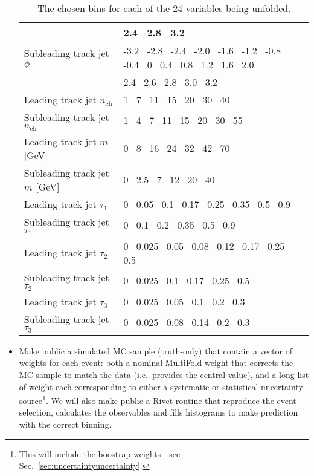 \begin{itemize}
\begin{table}[h!]
\begin{tabular}{l|l}
                                               & 2.4~ 2.8~ 3.2 \\ \hline
       Subleading track jet $\phi$             & -3.2~ -2.8~ -2.4~ -2.0~ -1.6~ -1.2~ -0.8~ -0.4~ 0~ 0.4~ 0.8~ 1.2~ 1.6~ 2.0~ \\
                                               & 2.4~ 2.6~ 2.8~ 3.0~ 3.2 \\ \hline
       Leading track jet $n_{\text{ch}}$       & 1~ 7~ 11~ 15~ 20~ 30~ 40 \\ \hline
       Subleading track jet $n_{\text{ch}}$    & 1~ 4~ 7~ 11~ 15~ 20~ 30~ 55 \\ \hline
       Leading track jet $m$ [GeV]             & 0~ 8~ 16~ 24~ 32~ 42~ 70 \\ \hline
       Subleading track jet $m$ [GeV]          & 0~ 2.5~ 7~ 12~ 20~ 40 \\ \hline
       Leading track jet $\tau_1$              & 0~ 0.05~ 0.1~ 0.17~ 0.25~ 0.35~ 0.5~ 0.9 \\ \hline
       Subleading track jet $\tau_1$           & 0~ 0.1~ 0.2~ 0.35~ 0.5~ 0.9 \\ \hline
       Leading track jet $\tau_2$              & 0~ 0.025~ 0.05~ 0.08~ 0.12~ 0.17~ 0.25~ 0.5 \\ \hline
       Subleading track jet $\tau_2$           & 0~ 0.025~ 0.1~ 0.17~ 0.25~ 0.5 \\ \hline
       Leading track jet $\tau_3$              & 0~ 0.025~ 0.05~ 0.1~ 0.2~ 0.3 \\ \hline
       Subleading track jet $\tau_3$           & 0~ 0.025~ 0.08~ 0.14~ 0.2~ 0.3 \\ \hline

       \end{tabular}
       \caption{The chosen bins for each of the 24 variables being unfolded.}
       \label{tab:IBUBins}
   \end{table}

\item
  Make public a simulated MC sample (truth-only) that contain a vector of weights for each event: both a nominal MultiFold weight that corrects the MC sample to match the data (i.e.\ provides the central value), and a long list of weight each corresponding to either a systematic or statistical uncertainty source\footnote{This will include the boostrap weights - see Sec.~\ref{sec:uncertaintyuncertainty}.}. We will also make public a Rivet routine that reproduce the event selection, calculates the observables and fills histograms to make prediction with the correct binning.
\end{itemize}

